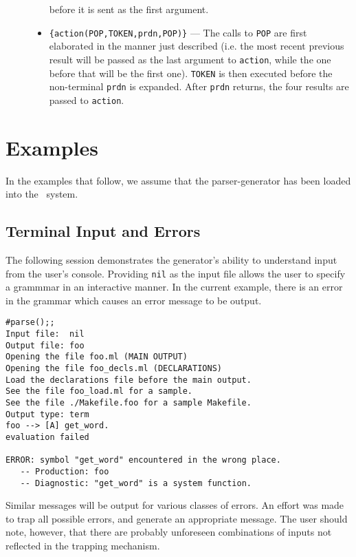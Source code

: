 \begin{description}
\begin{itemize}
      before it is sent as the first argument.
    \item \verb"{action(POP,TOKEN,prdn,POP)}" --- The
      calls to \verb"POP" are first elaborated in the manner just described
      (i.e. the most recent previous result will be passed as the last argument
      to {\tt action}, while the one before that will be the first one).
      \verb"TOKEN" is then executed before the
      non-terminal {\tt prdn} is
      expanded.  After {\tt prdn} returns, the four results are passed to
      {\tt action}.
   \end{itemize}
   \end{description}

\section{Examples} \label{ex}

In the examples that follow, we assume that the parser-generator has been 
loaded into the \HOL\ system.

\subsection{Terminal Input and Errors} \label{ex:errs}

The following session demonstrates the generator's ability to understand 
input from the user's console.  Providing \verb"nil" as the input file allows
the user to specify a grammmar in an interactive manner.  In the current
example, there is an error in the grammar which causes an error message
to be output.
\setcounter{sessioncount}{1}
\small
\begin{center}
\begin{session}
\begin{verbatim}
#parse();;
Input file:  nil
Output file: foo
Opening the file foo.ml (MAIN OUTPUT)
Opening the file foo_decls.ml (DECLARATIONS)
Load the declarations file before the main output.
See the file foo_load.ml for a sample.
See the file ./Makefile.foo for a sample Makefile.
Output type: term 
foo --> [A] get_word.
evaluation failed

ERROR: symbol "get_word" encountered in the wrong place.
   -- Production: foo 
   -- Diagnostic: "get_word" is a system function.
\end{verbatim}
\end{session}
\end{center}
\normalsize
Similar messages will be output for various classes of errors.  An effort
was made to trap all possible errors, and generate an appropriate message.
The user should note, however, that there are probably unforeseen combinations
of inputs not reflected in the trapping mechanism.

